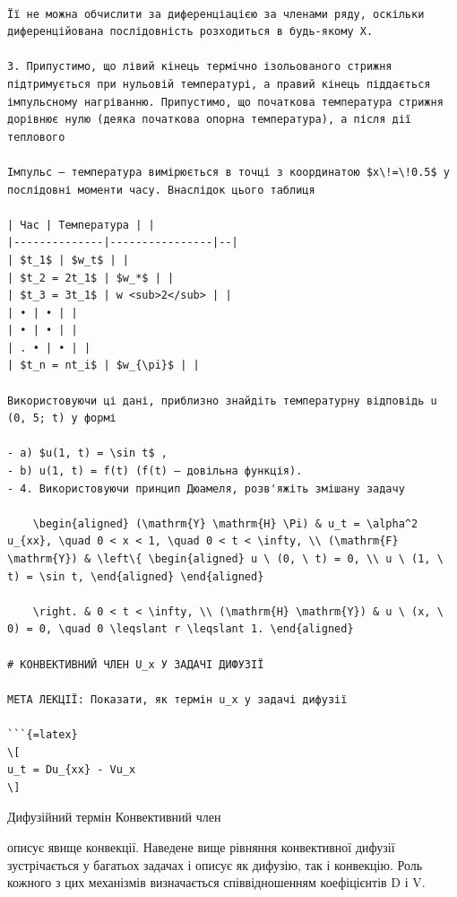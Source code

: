 \documentclass[
]{article}
\begin{document}
\begin{verbatim}

Її не можна обчислити за диференціацією за членами ряду, оскільки диференційована послідовність розходиться в будь-якому X.

3. Припустимо, що лівий кінець термічно ізольованого стрижня підтримується при нульовій температурі, а правий кінець піддається імпульсному нагріванню. Припустимо, що початкова температура стрижня дорівнює нулю (деяка початкова опорна температура), а після дії теплового

Імпульс — температура вимірюється в точці з координатою $x\!=\!0.5$ у послідовні моменти часу. Внаслідок цього таблиця

| Час | Температура | |
|--------------|----------------|--|
| $t_1$ | $w_t$ | |
| $t_2 = 2t_1$ | $w_*$ | |
| $t_3 = 3t_1$ | w <sub>2</sub> | |
| • | • | |
| • | • | |
| . • | • | |
| $t_n = nt_i$ | $w_{\pi}$ | |

Використовуючи ці дані, приблизно знайдіть температурну відповідь u (0, 5; t) у формі

- a) $u(1, t) = \sin t$ ,
- b) u(1, t) = f(t) (f(t) — довільна функція).
- 4. Використовуючи принцип Дюамеля, розв'яжіть змішану задачу

    \begin{aligned} (\mathrm{Y} \mathrm{H} \Pi) & u_t = \alpha^2 u_{xx}, \quad 0 < x < 1, \quad 0 < t < \infty, \\ (\mathrm{F} \mathrm{Y}) & \left\{ \begin{aligned} u \ (0, \ t) = 0, \\ u \ (1, \ t) = \sin t, \end{aligned} \end{aligned}

    \right. & 0 < t < \infty, \\ (\mathrm{H} \mathrm{Y}) & u \ (x, \ 0) = 0, \quad 0 \leqslant r \leqslant 1. \end{aligned}

# КОНВЕКТИВНИЙ ЧЛЕН U_x У ЗАДАЧІ ДИФУЗІЇ

МЕТА ЛЕКЦІЇ: Показати, як термін u_x у задачі дифузії

```{=latex}
\[
u_t = Du_{xx} - Vu_x
\]
\end{verbatim}

Дифузійний термін Конвективний член

описує явище конвекції. Наведене вище рівняння конвективної дифузії
зустрічається у багатьох задачах і описує як дифузію, так і конвекцію.
Роль кожного з цих механізмів визначається співвідношенням коефіцієнтів
D і V.
\end{document}
